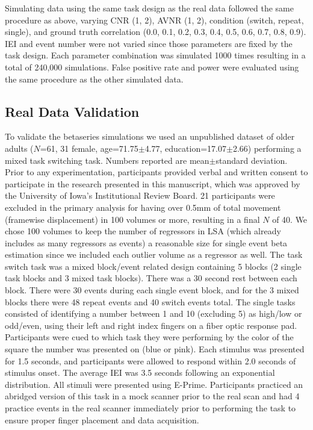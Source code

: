 \documentclass[10pt,letterpaper]{article}
\begin{document}
Simulating data using the same task design as the real data followed the same
procedure as above, varying CNR (1, 2), AVNR (1, 2), condition (switch, repeat, single),
and ground truth correlation (0.0, 0.1, 0.2, 0.3, 0.4, 0.5, 0.6, 0.7, 0.8, 0.9).
IEI and event number were not varied since those parameters are fixed by the
task design.
Each parameter combination was simulated 1000 times resulting in a total of 240,000 simulations.
False positive rate and power were evaluated using the same procedure as the other simulated data.

\subsection*{Real Data Validation}
\label{methods:task-switch}

To validate the betaseries simulations we used an unpublished dataset
of older adults ($N$=61, 31 female, age=71.75$\pm$4.77, education=17.07$\pm$2.66)
performing a mixed task switching task.
Numbers reported are mean$\pm$standard deviation.
Prior to any experimentation, participants provided verbal and written consent
to participate in the research presented in this manuscript, which was approved
by the University of Iowa's Institutional Review Board.
21 participants were excluded in the primary analysis for having over
0.5mm of total movement (framewise displacement) in 100 volumes or more,
resulting in a final $N$ of 40.
We chose 100 volumes to keep the number of regressors in LSA
(which already includes as many regressors as events) a reasonable size
for single event beta estimation since we included each outlier volume
as a regressor as well.
The task switch task was a mixed block/event related design containing
5 blocks (2 single task blocks and 3 mixed task blocks).
There was a 30 second rest between each block.
There were 30 events during each single event block,
and for the 3 mixed blocks there were 48 repeat events and 40 switch events total.
The single tasks consisted of identifying a number between
1 and 10 (excluding 5) as high/low or odd/even, using their left and right index fingers
on a fiber optic response pad.
Participants were cued to which task they were performing by the color of the square
the number was presented on (blue or pink).
Each stimulus was presented for 1.5 seconds, and participants were allowed
to respond within 2.0 seconds of stimulus onset.
The average IEI was 3.5 seconds following an exponential distribution.
All stimuli were presented using E-Prime.
Participants practiced an abridged version of this task in a mock scanner
prior to the real scan and had 4 practice events in the real scanner immediately
prior to performing the task to ensure proper finger placement and data acquisition.
\end{document}
